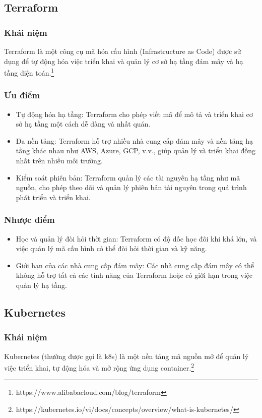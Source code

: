 \subsection{Terraform}
\subsubsection{Khái niệm}
\noindent Terraform là một công cụ mã hóa cấu hình (Infrastructure as Code) được sử dụng để tự động hóa việc triển khai và quản lý cơ sở hạ tầng đám mây và hạ tầng điện toán.\footnote{https://www.alibabacloud.com/blog/terraform}
\subsubsection{Ưu điểm}
\begin{itemize}
    \item Tự động hóa hạ tầng: 
    Terraform cho phép viết mã để mô tả và triển khai cơ sở hạ tầng một cách dễ dàng và nhất quán.
    \item Đa nền tảng: 
    Terraform hỗ trợ nhiều nhà cung cấp đám mây và nền tảng hạ tầng khác nhau như AWS, Azure, GCP, v.v., giúp quản lý và triển khai đồng nhất trên nhiều môi trường.
    \item Kiểm soát phiên bản: 
    Terraform quản lý các tài nguyên hạ tầng như mã nguồn, cho phép theo dõi và quản lý phiên bản tài nguyên trong quá trình phát triển và triển khai.
\end{itemize}
\subsubsection{Nhược điểm}
\begin{itemize}
    \item Học và quản lý đòi hỏi thời gian: Terraform có độ dốc học đôi khi khá lớn, và việc quản lý mã cấu hình có thể đòi hỏi thời gian và kỹ năng.
    \item Giới hạn của các nhà cung cấp đám mây: Các nhà cung cấp đám mây có thể không hỗ trợ tất cả các tính năng của Terraform hoặc có giới hạn trong việc quản lý hạ tầng.
\end{itemize}
\subsection{Kubernetes}
\subsubsection{Khái niệm}
\noindent Kubernetes (thường được gọi là k8s) là một nền tảng mã nguồn mở để quản lý việc triển khai, tự động hóa và mở rộng ứng dụng container.\footnote{https://kubernetes.io/vi/docs/concepts/overview/what-is-kubernetes/}\\[0.5cm]

